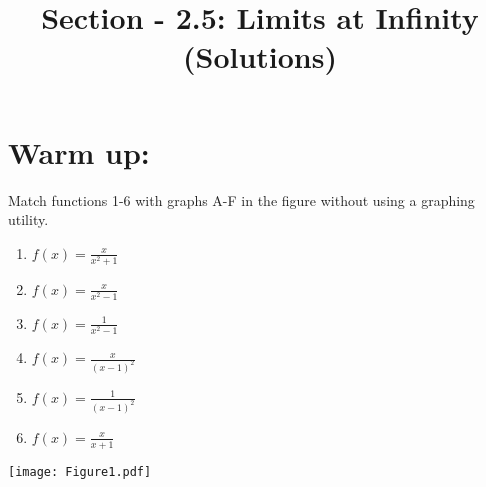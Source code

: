 \documentclass[nooutcomes]{ximera}
\title{Section - 2.5:  Limits at Infinity (Solutions)}
\begin{document}
\begin{abstract}		\end{abstract}
\maketitle

\section*{Warm up:}  
Match functions 1-6 with graphs A-F in the figure without using a graphing utility.
	\begin{enumerate}[label=\arabic*.]
	\item $f(x) = \frac{x}{x^2 + 1}$  
	\item $f(x) = \frac{x}{x^2 -1}$
	\item $f(x) = \frac{1}{x^2 -1}$
	\item $f(x) = \frac{x}{(x-1)^2}$
	\item $f(x) = \frac{1}{(x-1)^2}$
	\item $f(x) = \frac{x}{x+1}$
	\end{enumerate}
	
	\begin{image}
	\texttt{[image: Figure1.pdf]}
	\end{image}
\end{document}
